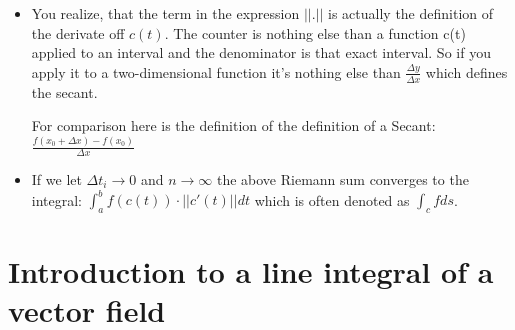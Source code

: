 \documentclass[12pt,a4paper]{article}
\begin{document}
\begin{itemize}
	\item You realize, that the term in the expression $||.||$ is actually the definition of the derivate off $c(t)$. The counter is nothing else than a function c(t) applied to an interval and the denominator is that exact interval. So if you apply it to a two-dimensional function it's nothing else than $\frac{\Delta y}{\Delta x}$ which defines the secant. 
	
	For comparison here is the definition of the definition of a Secant: \\
	$\frac{f(x_0 + \Delta x) - f(x_0)}{\Delta x}$


	\item If we let $\Delta t_i \rightarrow 0$ and $n \rightarrow \infty $ the above Riemann sum converges to the integral:
	$\int_{a}^{b} f(c(t))\cdot ||c'(t)|| dt$ which is often denoted as $\int_{c}^{}f ds$.
	\end{itemize}
	
	\section{Introduction to a line integral of a vector field}
	
\end{document}
